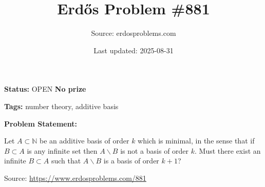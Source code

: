 \documentclass{article}
\title{Erd\H{o}s Problem \#881}
\date{Last updated: 2025-08-31}
\author{Source: erdosproblems.com}
\begin{document}
\maketitle

\noindent\textbf{Status:} OPEN \quad \textbf{No prize}

\noindent\textbf{Tags:} number theory, additive basis

\medskip

\noindent\textbf{Problem Statement:}

Let $A\subset\mathbb{N}$ be an additive basis of order $k$ which is minimal, in the sense that if $B\subset A$ is any infinite set then $A\backslash B$ is not a basis of order $k$. Must there exist an infinite $B\subset A$ such that $A\backslash B$ is a basis of order $k+1$?


\bigskip
\noindent\small{Source: \url{https://www.erdosproblems.com/881}}
\end{document}
